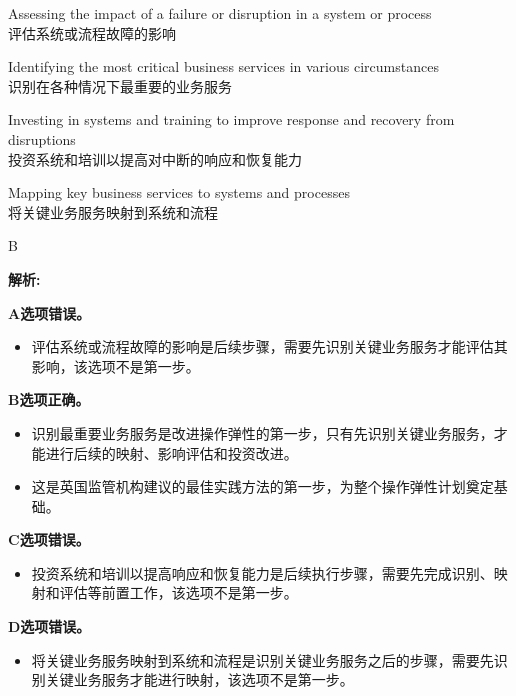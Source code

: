 \documentclass{article}
\newenvironment{explanation}
{\textbf{解析:}\par}
{\par}
\begin{document}
\begin{choices}
    \item Assessing the impact of a failure or disruption in a system or process\\评估系统或流程故障的影响
    \item Identifying the most critical business services in various circumstances\\识别在各种情况下最重要的业务服务
    \item Investing in systems and training to improve response and recovery from disruptions\\投资系统和培训以提高对中断的响应和恢复能力
    \item Mapping key business services to systems and processes\\将关键业务服务映射到系统和流程
\end{choices}

\begin{correctanswer}
    B
\end{correctanswer}

\begin{explanation}
    \textbf{A选项错误。}
    \begin{itemize}
        \item 评估系统或流程故障的影响是后续步骤，需要先识别关键业务服务才能评估其影响，该选项不是第一步。
    \end{itemize}

    \textbf{B选项正确。}
    \begin{itemize}
        \item 识别最重要业务服务是改进操作弹性的第一步，只有先识别关键业务服务，才能进行后续的映射、影响评估和投资改进。
        \item 这是英国监管机构建议的最佳实践方法的第一步，为整个操作弹性计划奠定基础。
    \end{itemize}

    \textbf{C选项错误。}
    \begin{itemize}
        \item 投资系统和培训以提高响应和恢复能力是后续执行步骤，需要先完成识别、映射和评估等前置工作，该选项不是第一步。
    \end{itemize}

    \textbf{D选项错误。}
    \begin{itemize}
        \item 将关键业务服务映射到系统和流程是识别关键业务服务之后的步骤，需要先识别关键业务服务才能进行映射，该选项不是第一步。
    \end{itemize}
\end{explanation}
\end{document}
